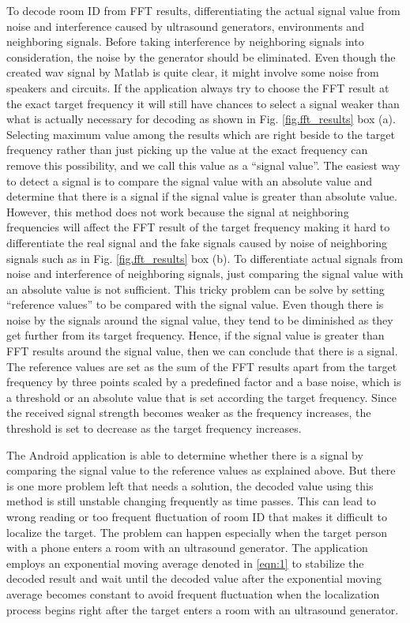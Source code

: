 To decode room ID from FFT results, differentiating the actual signal value from noise and interference caused by ultrasound generators, environments and neighboring signals. Before taking interference by neighboring signals into consideration, the noise by the generator should be eliminated. Even though the created wav signal by Matlab is quite clear, it might involve some noise from speakers and circuits. If the application always try to choose the FFT result at the exact target frequency it will still have chances to select a signal weaker than what is actually necessary for decoding as shown in Fig. \ref{fig.fft_results} box (a). Selecting maximum value among the results which are right beside to the target frequency rather than just picking up the value at the exact frequency can remove this possibility, and we call this value as a “signal value”. The easiest way to detect a signal is to compare the signal value with an absolute value and determine that there is a signal if the signal value is greater than absolute value. However, this method does not work because the signal at neighboring frequencies will affect the FFT result of the target frequency making it hard to differentiate the real signal and the fake signals caused by noise of neighboring signals such as in Fig. \ref{fig.fft_results} box (b). To differentiate actual signals from noise and interference of neighboring signals, just comparing the signal value with an absolute value is not sufficient. This tricky problem can be solve by setting “reference values” to be compared with the signal value. Even though there is noise by the signals around the signal value, they tend to be diminished as they get further from its target frequency. Hence, if the signal value is greater than FFT results around the signal value, then we can conclude that there is a signal. The reference values are set as the sum of the FFT results apart from the target frequency by three points scaled by a predefined factor and a base noise, which is a threshold or an absolute value that is set according the target frequency. Since the received signal strength becomes weaker as the frequency increases, the threshold is set to decrease as the target frequency increases.

The Android application is able to determine whether there is a signal by comparing the signal value to the reference values as explained above. But there is one more problem left that needs a solution, the decoded value using this method is still unstable changing frequently as time passes. This can lead to wrong reading or too frequent fluctuation of room ID that makes it difficult to localize the target.  The problem can happen especially when the target person with a phone enters a room with an ultrasound generator. The application employs an exponential moving average denoted in \ref{eqn:1} to stabilize the decoded result and wait until the decoded value after the exponential moving average becomes constant to avoid frequent fluctuation when the localization process begins right after the target enters a room with an ultrasound generator.

